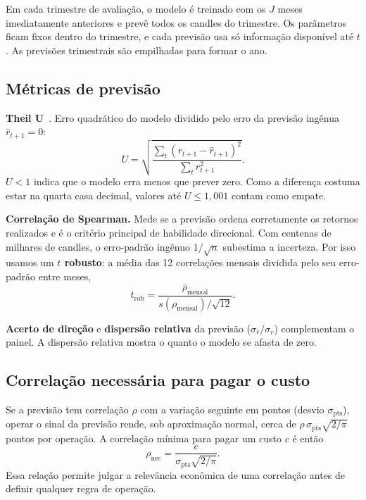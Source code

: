 \documentclass[conference]{IEEEtran}
\begin{document}
Em cada trimestre de avaliação, o modelo é treinado com os $J$ meses imediatamente anteriores e prevê todos os candles do trimestre. Os parâmetros ficam fixos dentro do trimestre, e cada previsão usa só informação disponível até $t$. As previsões trimestrais são empilhadas para formar o ano.

\subsection{Métricas de previsão}

\textbf{Theil U}~\cite{theil1966}. Erro quadrático do modelo dividido pelo erro da previsão ingênua $\hat r_{t+1} = 0$:
\begin{equation}
  U = \sqrt{\frac{\sum_t (r_{t+1} - \hat r_{t+1})^2}{\sum_t r_{t+1}^2}}.
  \label{eq:theil}
\end{equation}
$U < 1$ indica que o modelo erra menos que prever zero. Como a diferença costuma estar na quarta casa decimal, valores até $U \leq 1{,}001$ contam como empate.

\textbf{Correlação de Spearman.} Mede se a previsão ordena corretamente os retornos realizados e é o critério principal de habilidade direcional. Com centenas de milhares de candles, o erro-padrão ingênuo $1/\sqrt{n}$ subestima a incerteza. Por isso usamos um \textbf{$t$ robusto}: a média das 12 correlações mensais dividida pelo seu erro-padrão entre meses,
\begin{equation}
  t_{\text{rob}} = \frac{\bar\rho_{\text{mensal}}}{s(\rho_{\text{mensal}})/\sqrt{12}}.
  \label{eq:trob}
\end{equation}

\textbf{Acerto de direção} e \textbf{dispersão relativa} da previsão ($\sigma_{\hat r}/\sigma_r$) complementam o painel. A dispersão relativa mostra o quanto o modelo se afasta de zero.

\subsection{Correlação necessária para pagar o custo}

Se a previsão tem correlação $\rho$ com a variação seguinte em pontos (desvio $\sigma_{\text{pts}}$), operar o sinal da previsão rende, sob aproximação normal, cerca de $\rho\,\sigma_{\text{pts}}\sqrt{2/\pi}$ pontos por operação. A correlação mínima para pagar um custo $c$ é então
\begin{equation}
  \rho_{\text{nec}} = \frac{c}{\sigma_{\text{pts}}\sqrt{2/\pi}}.
  \label{eq:rhonec}
\end{equation}
Essa relação permite julgar a relevância econômica de uma correlação antes de definir qualquer regra de operação.
\end{document}
